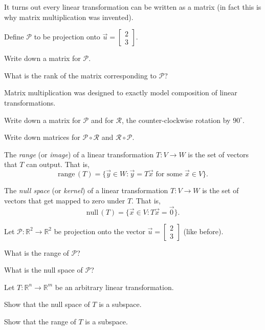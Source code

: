 \documentclass{problemset}
\newcommand{\R}{\mathbb{R}}
\newcommand{\Null}{\mathrm{null}\,}
\newcommand{\Range}{\mathrm{range}\,}
\newcommand{\mat}[1]{\begin{bmatrix}#1\end{bmatrix}}
\begin{document}
	It turns out every linear transformation can be written as a matrix (in fact
	this is why matrix multiplication was invented).

	\question
	Define $\mathcal P$ to be projection onto $\vec u=\mat{2\\3}$.
	\begin{parts}
		\item Write down a matrix for $\mathcal P$.
		\item What is the rank of the matrix corresponding to $\mathcal P$?
	\end{parts}

	Matrix multiplication was designed to exactly model composition of linear transformations.
	\begin{parts}[resume]
		\item Write down a matrix for $\mathcal P$ and for $\mathcal R$, the counter-clockwise rotation
			by $90^\circ$.
		\item Write down matrices for $\mathcal P\circ\mathcal R$ and $\mathcal R\circ \mathcal P$.
	\end{parts}

	\begin{definition}[Range]
		The \emph{range} (or \emph{image}) of a linear transformation $T:V\to W$ is the set of vectors that
		$T$ can output.  That is,
		\[
			\Range(T)=\{\vec y\in W:\vec y=T\vec x\text{ for some }\vec x\in V\}.
		\]
	\end{definition}
	\begin{definition}
		The \emph{null space} (or \emph{kernel}) of a linear transformation $T:V\to W$ is the
		set of vectors that get mapped to zero under $T$.  That is,
		\[
			\Null(T)=\{\vec x\in V:T\vec x=\vec 0\}.
		\]
	\end{definition}

	\question
	Let $\mathcal P:\R^2\to\R^2$ be projection onto the vector $\vec u=\mat{2\\3}$ (like before).
	\begin{parts}
		\item What is the range of $\mathcal P$?
		\item What is the null space of $\mathcal P$?
	\end{parts}

	\question
	Let $T:\R^n\to\R^m$ be an arbitrary linear transformation.
	\begin{parts}
		\item Show that the null space of $T$ is a subspace.
		\item Show that the range of $T$ is a subspace.
	\end{parts}
\end{document}
